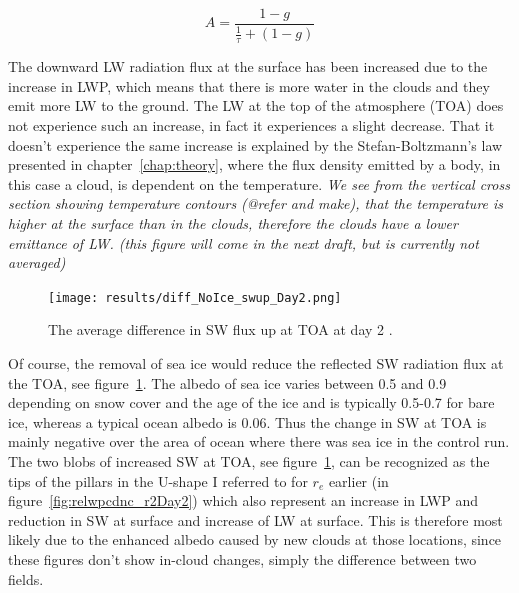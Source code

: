\begin{equation}
A = \frac{1-g}{\frac{1}{\tau}+(1-g)}
\label{eqn:cloudalbedo}
\end{equation}

The downward LW radiation flux at the surface has been increased due to the increase in LWP, which means that there is more water in the clouds and they emit more LW to the ground. %
The LW at the top of the atmosphere (TOA) does not experience such an increase, in fact it experiences a slight decrease. That it doesn't experience the same increase is explained by the Stefan-Boltzmann's law presented in chapter~\ref{chap:theory}, where the flux density emitted by a body, in this case a cloud, is dependent on the temperature. %
\textit{ We see from the vertical cross section showing temperature contours (@refer and make), that the temperature is higher at the surface than in the clouds, therefore the clouds have a lower emittance of LW. (this figure will come in the next draft, but is currently not averaged)}

\begin{figure}
\centering
\texttt{[image: results/diff\_NoIce\_swup\_Day2.png]}
\caption{The average difference in SW flux up at TOA at day 2 .}
\label{fig:swupdiff_r2Day2}
\end{figure}
Of course, the removal of sea ice would reduce the reflected SW radiation flux at the TOA, see figure~\ref{fig:swupdiff_r2Day2}. The albedo of sea ice varies between 0.5 and 0.9 depending on snow cover and the age of the ice and is typically 0.5-0.7 for bare ice, whereas a typical ocean albedo is 0.06. Thus the change in SW at TOA is mainly negative over the area of ocean where there was sea ice in the control run. The two blobs of increased SW at TOA, see figure~\ref{fig:swupdiff_r2Day2}, can be recognized as the tips of the pillars in the U-shape I referred to for $r_e$ earlier (in figure~\ref{fig:relwpcdnc_r2Day2}) which also represent an increase in LWP and reduction in SW at surface and increase of LW at surface. This is therefore most likely due to the enhanced albedo caused by new clouds at those locations, since these figures don't show in-cloud changes, simply the difference between two fields.

